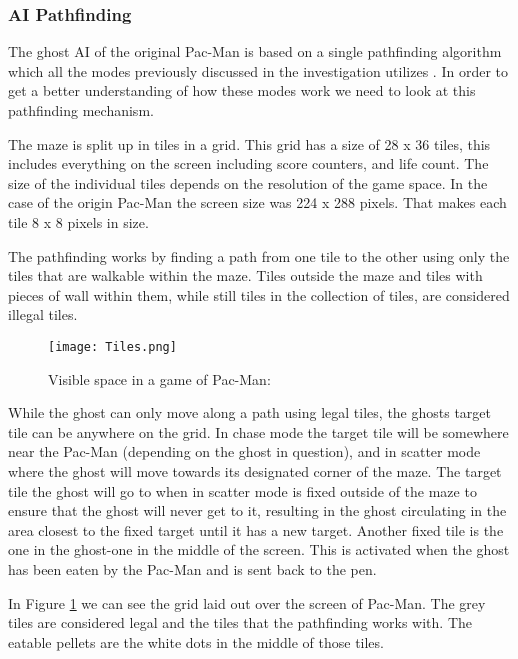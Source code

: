 
\subsubsection{AI Pathfinding}
The ghost AI of the original Pac-Man is based on a single pathfinding algorithm which all the modes previously discussed in the investigation utilizes \cite{Pittman2011}.
In order to get a better understanding of how these modes work we need to look at this pathfinding mechanism.

The maze is split up in tiles in a grid.
This grid has a size of 28 x 36 tiles, this includes everything on the screen including score counters, and life count.
The size of the individual tiles depends on the resolution of the game space.
In the case of the origin Pac-Man the screen size was 224 x 288 pixels.
That makes each tile 8 x 8 pixels in size.

The pathfinding works by finding a path from one tile to the other using only the tiles that are walkable within the maze.
Tiles outside the maze and tiles with pieces of wall within them, while still tiles in the collection of tiles, are considered illegal tiles.

\begin{figure}[!htbp]
\centering
\texttt{[image: Tiles.png]}
\caption{Visible space in a game of Pac-Man: \cite{Pittman2011} }
\label{fig:Pacman_visible_space}
\end{figure}

While the ghost can only move along a path using legal tiles, the ghosts target tile can be anywhere on the grid.
In chase mode the target tile will be somewhere near the Pac-Man (depending on the ghost in question), and in scatter mode where the ghost will move towards its designated corner of the maze.
The target tile the ghost will go to when in scatter mode is fixed outside of the maze to ensure that the ghost will never get to it, resulting in the ghost circulating in the area closest to the fixed target until it has a new target.
Another fixed tile is the one in the ghost-one in the middle of the screen.
This is activated when the ghost has been eaten by the Pac-Man and is sent back to the pen.

In Figure \ref{fig:Pacman_visible_space} we can see the grid laid out over the screen of Pac-Man. The grey tiles are considered legal and the tiles that the pathfinding works with. The eatable pellets are the white dots in the middle of those tiles.

